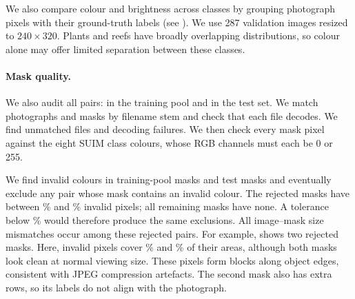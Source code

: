 


We also compare colour and brightness across classes by grouping photograph
pixels with their ground-truth labels (see ). We use
287 validation images resized to $240\times320$. Plants and reefs have
broadly overlapping distributions, so colour alone may offer limited
separation between these classes.


\paragraph{Mask quality.}
We also audit all \suimOnDiskTotal{} pairs: \suimTrainValOnDisk{} in the training
pool and \suimTestOnDisk{} in the test set. We match photographs and masks by
filename stem and check that each file decodes. We find \suimUnpaired{}
unmatched files and \suimDecodeErrors{} decoding failures. We then check every
mask pixel against the eight SUIM class colours, whose RGB channels must each
be 0 or 255.

We find invalid colours in \suimOffCodeMasks{} training-pool masks and
\suimTestOffCodeMasks{} test masks and eventually exclude any pair whose mask
contains an invalid colour. The rejected masks have between \suimOffCodeShareMin\% and
\suimOffCodeShareMax\% invalid pixels; all remaining masks have none. A
tolerance below \suimOffCodeShareMin\% would therefore produce the same
exclusions. All \suimSizeMismatches{} image--mask size mismatches occur among
these rejected pairs. For example,  shows two
rejected masks. Here, invalid pixels cover
\suimOffCodeShareSameSize\% and \suimOffCodeShareTaller\% of their areas,
although both masks look clean at normal viewing size. These pixels form blocks
along object edges, consistent with JPEG compression artefacts. The second
mask also has \suimTallerExtraRows{} extra rows, so its labels do not align with
the photograph.

